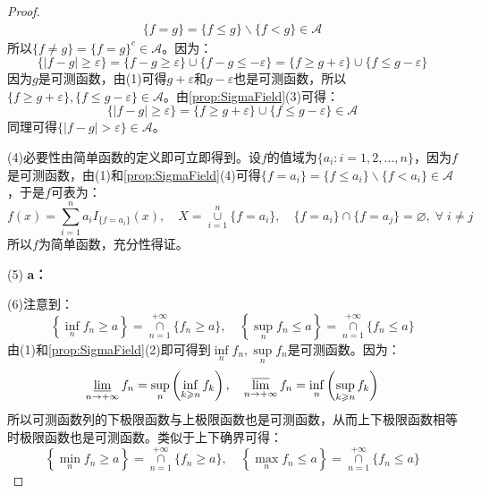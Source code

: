 \begin{proof}
\begin{align*}
		\{f=g\}=\{f\leqslant g\}\backslash\{f<g\}\in\mathscr{A}
	\end{align*}
	所以$\{f\ne g\}=\{f=g\}^c\in\mathscr{A}$。因为：
	\begin{equation*}
		\{|f-g|\geqslant\varepsilon\}=\{f-g\geqslant\varepsilon\}\cup\{f-g\leqslant-\varepsilon\}=\{f\geqslant g+\varepsilon\}\cup\{f\leqslant g-\varepsilon\}
	\end{equation*}
	因为$g$是可测函数，由(1)可得$g+\varepsilon$和$g-\varepsilon$也是可测函数，所以$\{f\geqslant g+\varepsilon\},\{f\leqslant g-\varepsilon\}\in\mathscr{A}$。由\cref{prop:SigmaField}(3)可得：
	\begin{equation*}
		\{|f-g|\geqslant\varepsilon\}=\{f\geqslant g+\varepsilon\}\cup\{f\leqslant g-\varepsilon\}\in \mathscr{A}
	\end{equation*}
	同理可得$\{|f-g|>\varepsilon\}\in\mathscr{A}$。\par
	(4)必要性由简单函数的定义即可立即得到。设$f$的值域为$\{a_i:i=1,2,\dots,n\}$，因为$f$是可测函数，由(1)和\cref{prop:SigmaField}(4)可得$\{f=a_i\}=\{f\leqslant a_i\}\backslash\{f<a_i\}\in\mathscr{A}$，于是$f$可表为：
	\begin{equation*}
		f(x)=\sum_{i=1}^{n}a_iI_{\{f=a_i\}}(x),\quad X=\underset{i=1}{\overset{n}{\cup}}\{f=a_i\},\quad\{f=a_i\}\cap\{f=a_j\}=\varnothing,\;\forall\;i\ne j
	\end{equation*}
	所以$f$为简单函数，充分性得证。\par
	(5)\textbf{ a：}\par
	(6)注意到：
	\begin{equation*}
		\left\{\inf_nf_n\geqslant a\right\}=\underset{n=1}{\overset{+\infty}{\cap}}\{f_n\geqslant a\},\quad\left\{\sup_nf_n\leqslant a\right\}=\underset{n=1}{\overset{+\infty}{\cap}}\{f_n\leqslant a\}
	\end{equation*}
	由(1)和\cref{prop:SigmaField}(2)即可得到$\inf\limits_nf_n,\sup\limits_nf_n$是可测函数。因为：
	\begin{equation*}
		\varliminf_{n\to+\infty}f_n=\sup_{n}\left(\inf_{k\geqslant n}f_k\right),\quad\varlimsup_{n\to+\infty}f_n=\inf_{n}\left(\sup_{k\geqslant n}f_k\right)
	\end{equation*}
	所以可测函数列的下极限函数与上极限函数也是可测函数，从而上下极限函数相等时极限函数也是可测函数。类似于上下确界可得：
	\begin{equation*}
		\left\{\min_nf_n\geqslant a\right\}=\underset{n=1}{\overset{+\infty}{\cap}}\{f_n\geqslant a\},\quad\left\{\max_nf_n\leqslant a\right\}=\underset{n=1}{\overset{+\infty}{\cap}}\{f_n\leqslant a\}

\end{equation*}
\end{proof}
